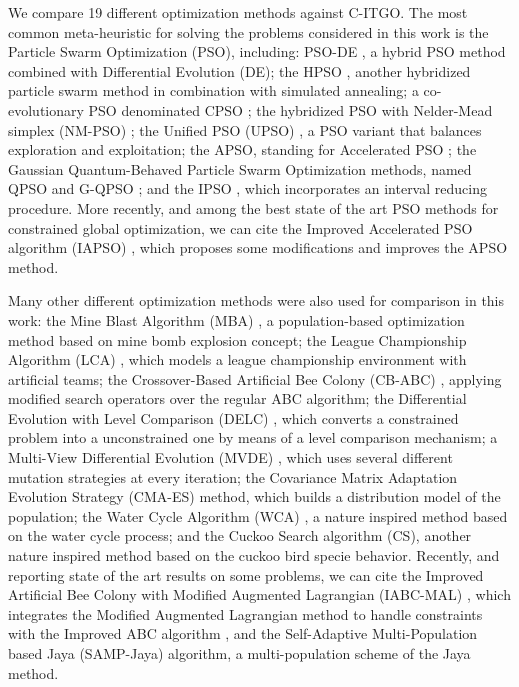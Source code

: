 We compare 19 different optimization methods against C-ITGO. The most common meta-heuristic for solving the problems considered in this work is the Particle Swarm Optimization (PSO), including: PSO-DE \citep{PSO-DE}, a hybrid PSO method combined with Differential Evolution (DE); the HPSO \citep{HPSO}, another hybridized particle swarm method in combination with simulated annealing; a co-evolutionary PSO denominated CPSO \citep{CPSO}; the hybridized PSO with Nelder-Mead simplex (NM-PSO) \citep{NM-PSO}; the Unified PSO (UPSO) \citep{UPSO}, a PSO variant that balances exploration and exploitation; the APSO, standing for Accelerated PSO  \citep{APSO}; the Gaussian Quantum-Behaved Particle Swarm Optimization methods, named QPSO and G-QPSO \citep{QPSO}; and the IPSO \citep{IPSO}, which incorporates an interval reducing procedure. More recently, and among the best state of the art PSO methods for constrained global optimization, we can cite the Improved Accelerated PSO algorithm (IAPSO) \citep{IAPSO}, which proposes some modifications and improves the APSO method.

Many other different optimization methods were also used for comparison in this work: the Mine Blast Algorithm (MBA) \citep{MBA}, a population-based optimization method based on mine bomb explosion concept; the League Championship Algorithm (LCA) \citep{LCA}, which models a league championship environment with artificial teams; the Crossover-Based Artificial Bee Colony (CB-ABC) \citep{CB-ABC}, applying modified search operators over the regular ABC algorithm; the Differential Evolution with Level Comparison (DELC) \citep{DELC}, which converts a constrained problem into a unconstrained one by means of a level comparison mechanism; a Multi-View Differential Evolution (MVDE) \citep{MVDE}, which uses several different mutation strategies at every iteration; the Covariance Matrix Adaptation Evolution Strategy (CMA-ES) \citep{CMA-ES} method, which builds a distribution model of the population; the Water Cycle Algorithm (WCA) \citep{WCA}, a nature inspired method based on the water cycle process; and the Cuckoo Search algorithm (CS), another nature inspired method based on the cuckoo bird specie behavior. Recently, and reporting state of the art results on some problems, we can cite the Improved Artificial Bee Colony with Modified Augmented Lagrangian (IABC-MAL) \citep{IABC-Mal}, which integrates the Modified Augmented Lagrangian method to handle constraints with the Improved ABC algorithm \citep{IABC}, and the Self-Adaptive Multi-Population based Jaya (SAMP-Jaya) \citep{SAMP-Jaya} algorithm, a multi-population scheme of the Jaya \citep{Jaya} method.


